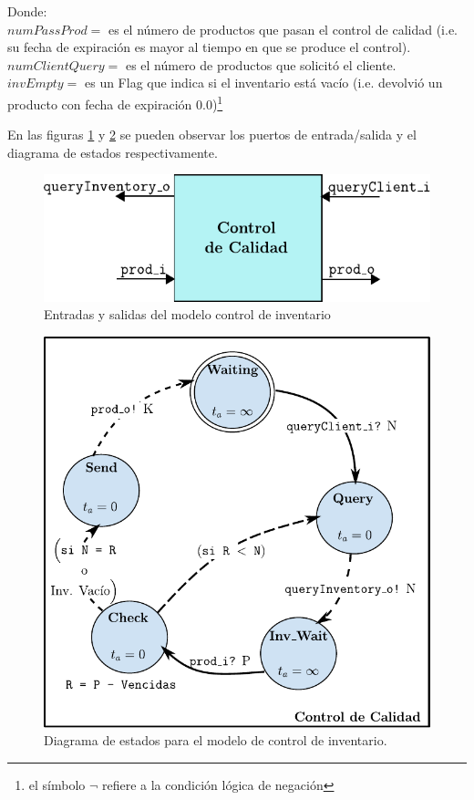 \documentclass[10pt]{article}
\begin{document}
Donde:\\
$numPassProd = $ es el número de productos que pasan el control de calidad (i.e. su fecha de expiración es mayor al tiempo en que se produce el control).\\
$numClientQuery = $ es el número de productos que solicitó el cliente.\\
$invEmpty = $ es un Flag que indica si el inventario está vacío (i.e. devolvió un producto con fecha de expiración $0.0$)\footnote{el símbolo $\neg$ refiere a la condición lógica de negación}

En las figuras \ref{fig:CC-esquematico} y \ref{fig:CC-estados} se pueden observar los puertos de entrada/salida y el diagrama de estados respectivamente.

\begin{figure}[h]
	\centering
	\includegraphics{img/CC-esquematico}
	\caption{Entradas y salidas del modelo control de inventario}
	\label{fig:CC-esquematico}
\end{figure}

\begin{figure}[h]
	\centering
	\includegraphics{img/controlCalidaddevsgraph}
	\caption{Diagrama de estados para el modelo de control de inventario.}
	\label{fig:CC-estados}
\end{figure}
\FloatBarrier
\end{document}
